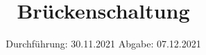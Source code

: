 

\subject{VERSUCH 302}
\title{Brückenschaltung}
\date{%
  Durchführung: 30.11.2021
  \hspace{3em}
  Abgabe: 07.12.2021
}



\maketitle
\thispagestyle{empty}
\tableofcontents
\newpage






\printbibliography{}


